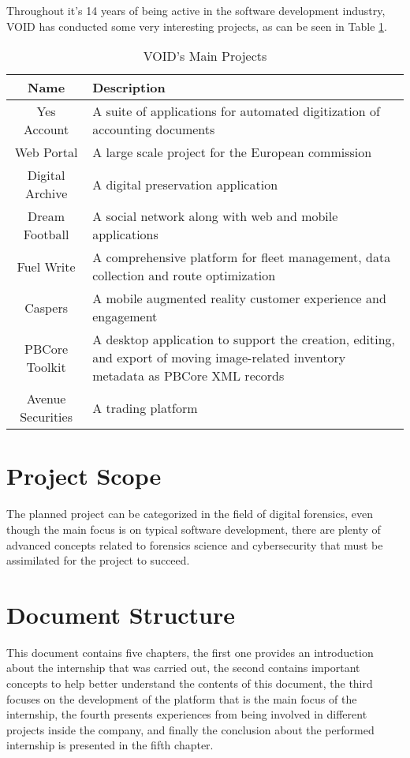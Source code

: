 Throughout it's 14 years of being active in the software development industry, VOID has conducted some very interesting projects, as can be seen in Table \ref{tab:voidProjects}.

\begin{table}[h]
  \begin{tabularx}{\textwidth}{@{}|c| *1{>{\centering\arraybackslash}X}@{}|}
    \hline
    \textbf{Name} & \textbf{Description} \\
    \hline\hline
    Yes Account & A suite of applications for automated digitization of accounting documents \\
    \hline
    Web Portal & A large scale project for the European commission \\
    \hline
    Digital Archive & A digital preservation application \\
    \hline
    Dream Football & A social network along with web and mobile applications  \\
    \hline
    Fuel Write & A comprehensive platform for fleet management, data collection and route optimization \\
    \hline
    Caspers & A mobile augmented reality customer experience and engagement \\
    \hline
    PBCore Toolkit & A desktop application to support the creation, editing, and export of moving image-related inventory metadata as PBCore XML records \\
    \hline
    Avenue Securities & A trading platform \\
    \hline
  \end{tabularx}
  \caption{VOID's Main Projects}
  \label{tab:voidProjects}
\end{table}

\section{Project Scope}

The planned project can be categorized in the field of digital forensics, even though the main focus is on typical software development, there are plenty of advanced concepts
related to forensics science and cybersecurity that must be assimilated for the project to succeed.


\section{Document Structure}

This document contains five chapters, the first one provides an introduction about the internship that was carried out, 
the second contains important concepts to help better understand the contents of this document, the third focuses on the development
of the platform that is the main focus of the internship, the fourth presents experiences from being involved in different projects inside the company,
and finally the conclusion about the performed internship is presented in the fifth chapter.

